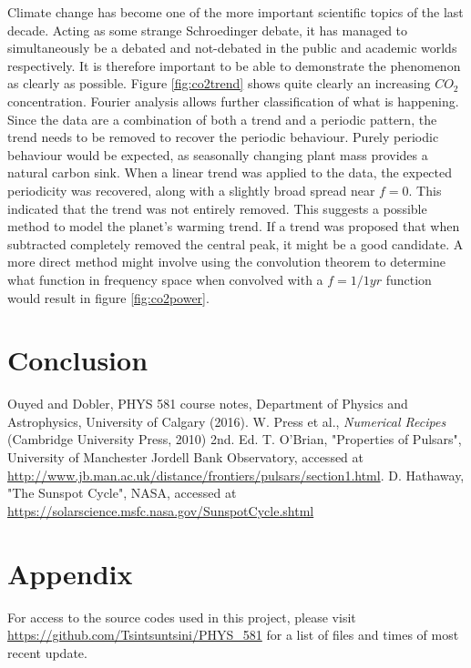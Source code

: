 \message{ !name(Assn2.tex)}\documentclass[twocolumn]{article}
\begin{document}
Climate change has become one of the more important scientific topics of the last decade. Acting as some strange Schroedinger debate, it has managed to simultaneously be a debated and not-debated in the public and academic worlds respectively. It is therefore important to be able to demonstrate the phenomenon as clearly as possible. Figure \ref{fig:co2trend} shows quite clearly an increasing $CO_2$ concentration. Fourier analysis allows further classification of what is happening. Since the data are a combination of both a trend and a periodic pattern, the trend needs to be removed to recover the periodic behaviour. Purely periodic behaviour would be expected, as seasonally changing plant mass provides a natural carbon sink. When a linear trend was applied to the data, the expected periodicity was recovered, along with a slightly broad spread near $f=0$. This indicated that the trend was not entirely removed. This suggests a possible method to model the planet's warming trend. If a trend was proposed that when subtracted completely removed the central peak, it might be a good candidate. A more direct method might involve using the convolution theorem to determine what function in frequency space when convolved with a $f=1/1yr$ function would result in figure \ref{fig:co2power}.

\section{Conclusion}



\begin{thebibliography}{00}
	Ouyed and Dobler, PHYS 581 course notes, Department of Physics and Astrophysics, University of Calgary (2016).
	W. Press et al., \emph{Numerical Recipes} (Cambridge University Press, 2010) 2nd. Ed.
	T. O'Brian, "Properties of Pulsars", University of Manchester Jordell Bank Observatory, accessed at \url{http://www.jb.man.ac.uk/distance/frontiers/pulsars/section1.html}.
	D. Hathaway, "The Sunspot Cycle",  NASA, accessed at \url{ https://solarscience.msfc.nasa.gov/SunspotCycle.shtml}
\end{thebibliography}

\section{Appendix}
For access to the source codes used in this project, please visit \url{https://github.com/Tsintsuntsini/PHYS_581} for a list of files and times of most recent update.
	
\end{document}
